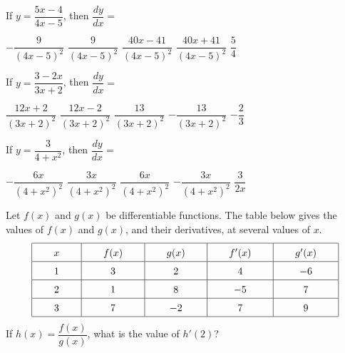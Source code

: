 \begin{questions}
    \question If $y = \dfrac{5x - 4}{4x - 5}$, then $\dfrac{dy}{dx} = $ \\

    \begin{oneparchoices}
        \choice $-\dfrac{9}{(4x - 5)^2}$
        \choice $\dfrac{9}{(4x - 5)^2}$ 
        \choice $\dfrac{40x - 41}{(4x - 5)^2}$
        \choice $\dfrac{40x + 41}{(4x - 5)^2}$
        \choice $\dfrac{5}{4}$
    \end{oneparchoices} \par \horizontalline

    \question If $y = \dfrac{3 - 2x}{3x + 2}$, then $\dfrac{dy}{dx} = $ \\

    \begin{oneparchoices}
        \choice $\dfrac{12x + 2}{(3x + 2)^2}$
        \choice $\dfrac{12x - 2}{(3x + 2)^2}$
        \choice $\dfrac{13}{(3x + 2)^2}$
        \choice $-\dfrac{13}{(3x + 2)^2}$
        \choice $-\dfrac{2}{3}$
    \end{oneparchoices} \par \horizontalline

    \question If $y = \dfrac{3}{4 + x^2}$, then $\dfrac{dy}{dx} = $ \\

    \begin{oneparchoices}
        \choice $-\dfrac{6x}{\left(4 + x^2\right)^2}$
        \choice $\dfrac{3x}{\left(4 + x^2\right)^2}$
        \choice $\dfrac{6x}{\left(4 + x^2\right)^2}$
        \choice $-\dfrac{3x}{\left(4 + x^2\right)^2}$
        \choice $\dfrac{3}{2x}$
    \end{oneparchoices} \par \horizontalline

    \question Let $f(x)$ and $g(x)$ be differentiable functions. The table below gives the values of $f(x)$ and $g(x)$, and their derivatives, at several values of $x$. \begin{align*}
        \arraycolsep=22pt\def\arraystretch{1.5} 
        \begin{array}{|c|c|c|c|c|}
            \hline
            x & f(x) & g(x) & f'(x) & g'(x) \\ \hline
            1 & 3 & 2 & 4 & -6 \\ \hline
            2 & 1 & 8 & -5 & 7 \\ \hline
            3 & 7 & -2 & 7 & 9 \\
            \hline
        \end{array}
    \end{align*}
    If $h(x) = \dfrac{f(x)}{g(x)}$, what is the value of $h'(2)$?


\end{questions}
